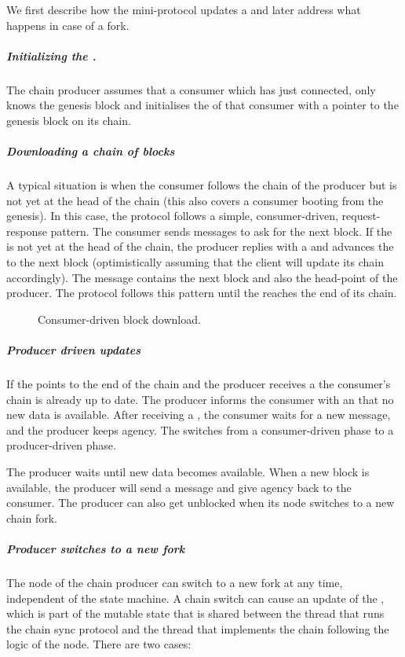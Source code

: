 We first describe how the mini-protocol updates a \readpointer{} and later address what happens in case
of a fork.
\subparagraph{Initializing the \readpointer{}.}
The chain producer assumes that a consumer which has just connected,
only knows the genesis block and initialises the \readpointer{} of that consumer
with a pointer to the genesis block on its chain.

\subparagraph{Downloading a chain of blocks}
A typical situation is when the consumer follows the chain of the producer but is not yet at the head of the
chain (this also covers a consumer booting from the genesis).
In this case, the protocol follows a simple, consumer-driven, request-response pattern.
The consumer sends \MsgRequestNext{} messages to ask for the next block.
If the \readpointer{} is not yet at the head of the chain,
the producer replies with a \MsgRollForward{} and advances the \readpointer{} to
the next block (optimistically assuming that the client will update its chain
accordingly).
The \MsgRollForward{} message contains the next block and also the head-point of the producer.
The protocol follows this pattern until the \readpointer{} reaches the end of its chain.

\begin{figure}[ht]
\begin{center}
\end{center}
\caption{Consumer-driven block download.}
\label{read-pointer-consumer-driver}
\end{figure}

\subparagraph{Producer driven updates}
If the \readpointer{} points to the end of the chain and the producer receives
a \MsgRequestNext{}
the consumer's chain is already up to date.
The producer informs the consumer with an \MsgAwaitReply{} that no new data is available.
After receiving a \MsgAwaitReply{}, the consumer waits for a new message, and the producer keeps agency.
The \MsgAwaitReply{} switches from a consumer-driven phase to a producer-driven phase.

The producer waits until new data becomes available.
When a new block is available, the producer will
send a \MsgRollForward{} message and give agency back to the consumer.
The producer can also get unblocked when its node switches to a new chain fork.

\subparagraph{Producer switches to a new fork}
The node of the chain producer can switch to a new fork at any time, independent of the
state machine.
A chain switch can cause an update of the \readpointer{},
which is part of the mutable state that is shared between the thread that runs
the chain sync protocol and the thread that implements the chain following the logic of the node.
There are two cases:


